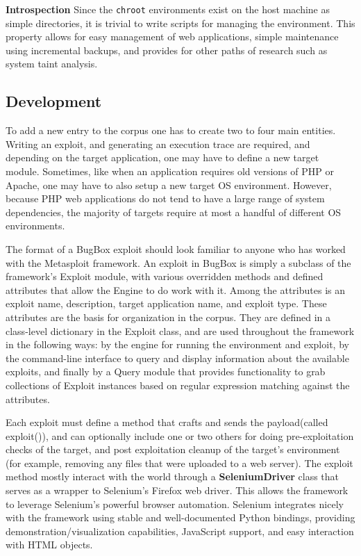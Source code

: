 \documentclass[letterpaper,twocolumn,10pt]{article}
\begin{document}
{\bf Introspection} Since the {\tt chroot} environments exist on the host machine as simple directories, it is trivial to write scripts for managing the environment. This property allows for easy management of web applications, simple maintenance using incremental backups, and provides for other paths of research such as system taint analysis.

\subsection{Development}

To add a new entry to the corpus one has to create two to four main entities. Writing an exploit, and generating an execution trace are required, and depending on the target application, one may have to define a new target module. Sometimes, like when an application requires old versions of PHP or Apache, one may have to also setup a new target OS environment. However, because PHP web applications do not tend to have a large range of system dependencies, the majority of targets require at most a handful of different OS environments. \par
The format of a BugBox exploit should look familiar to anyone who has worked with the Metasploit framework. An exploit in BugBox is simply a subclass of the framework's Exploit module, with various overridden methods and defined attributes that allow the Engine to do work with it.  Among the attributes is an exploit name, description, target application name, and exploit type. These attributes are the basis for organization in the corpus. They are defined in a class-level dictionary in the Exploit class, and are used throughout the framework in the following ways: by the engine for running the environment and exploit, by the command-line interface to query and display information about the available exploits, and finally by a Query module that provides functionality to grab collections of Exploit instances based on regular expression matching against the attributes. \par
Each exploit must define a method that crafts and sends the payload(called exploit()), and can optionally include one or two others for doing pre-exploitation checks of the target, and post exploitation cleanup of the target's environment (for example, removing any files that were uploaded to a web server). The exploit method mostly interact with the world through a {\bf SeleniumDriver} class that serves as a wrapper to Selenium's Firefox web driver. This allows the framework to leverage Selenium's powerful browser automation. Selenium integrates nicely with the framework using stable and well-documented Python bindings, providing demonstration/visualization capabilities, JavaScript support, and easy interaction with HTML objects. \par
\end{document}
